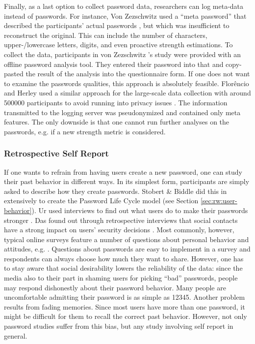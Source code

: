 Finally, as a last option to collect password data, researchers can log meta-data instead of passwords. For instance, Von Zezschwitz \etal used a ``meta password'' that described the participants' actual passwords \cite{VonZezschwitz2013SurvivalShortest}, but which was insufficient to reconstruct the original. This can include the number of characters, upper-/lowercase letters, digits, and even proactive strength estimations. To collect the data, participants in von Zezschwitz \etal's study were provided with an offline password analysis tool. They entered their password into that and copy-pasted the result of the analysis into the questionnaire form. If one does not want to examine the passwords qualities, this approach is absolutely feasible. Florêncio and Herley used a similar approach for the large-scale data collection with around 500000 participants to avoid running into privacy issues \cite{Florencio2007LargeScaleStudyPasswordHabits}. The information transmitted to the logging server was pseudonymized and contained only meta features. The only downside is that one cannot run further analyses on the passwords, e.g. if a new strength metric is considered.

\subsubsection{Retrospective Self Report}
If one wants to refrain from having users create a new password, one can study their past behavior in different ways. In its simplest form, participants are simply asked to describe how they create passwords. Stobert \& Biddle did this in extensively to create the Password Life Cycle model \cite{Stobert2014PasswordLifeCycle} (see Section \ref{sec:rw:user-behavior}). Ur \etal used interviews to find out what users do to make their passwords stronger \cite{Ur2015PWCreationLab}. Das \etal found out through retrospective interviews that social contacts have a strong impact on users' security decisions \cite{Das2014EffectSocialInfluenceSecuritySensitivity}. Most commonly, however, typical online surveys feature a number of questions about personal behavior and attitudes, e.g. \cite{Adams1997MakingPWsSecureAndUsable, Gaw2006PasswordManagement, Kuo2006HumanSelectionMnemonic,Riley2006WhatUsersKnowWhatTheyDo, Shay2010EncounteringPasswordRequirements}. Questions about passwords are easy to implement in a survey and respondents can always choose how much they want to share. However, one has to stay aware that social desirability lowers the reliability of the data: since the media also to their part in shaming users for picking ``bad'' passwords, people may respond dishonestly about their password behavior. Many people are uncomfortable admitting their password is as simple as 12345. Another problem results from fading memories. Since most users have more than one password, it might be difficult for them to recall the correct past behavior. However, not only password studies suffer from this bias, but any study involving self report in general. 

